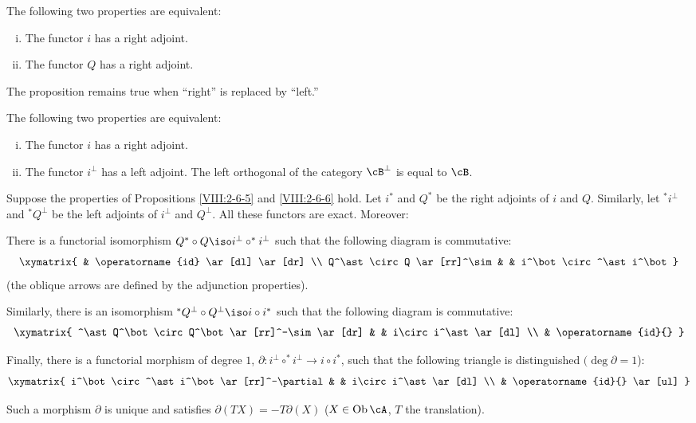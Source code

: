 \documentclass[oneside]{book}
\begin{document}
\begin{proposition}\label{VIII:2-6-5}
The following two properties are equivalent:
\begin{enumerate}[(i)]
  \item The functor $i$ has a right adjoint.
  \item The functor $Q$ has a right adjoint.
\end{enumerate}
\end{proposition}

The proposition remains true when “right” is replaced by “left.”

\begin{proposition}\label{VIII:2-6-6}
The following two properties are equivalent:
\begin{enumerate}[(i)]
  \item The functor $i$ has a right adjoint.
  \item The functor $i^\bot$ has a left adjoint. The left orthogonal of the
    category $\cB^\bot$ is equal to $\cB$.
\end{enumerate}
\end{proposition}

\begin{proposition}\label{VIII:2-6-7}
Suppose the properties of Propositions \ref{VIII:2-6-5} and
\ref{VIII:2-6-6} hold. Let $i^\ast$ and $Q^\ast$ be the right adjoints of
$i$ and $Q$. Similarly, let $^\ast i^\bot$ and $^\ast Q^\bot$ be the left
adjoints of $i^\bot$ and $Q^\bot$. All these functors are exact. Moreover:

There is a functorial isomorphism
$Q^\ast\circ Q\iso i^\bot\circ ^\ast i^\bot$ such that the following
diagram is commutative:
\[\xymatrix{
  & \operatorname{id} \ar[dl] \ar[dr] \\
  Q^\ast \circ Q \ar[rr]^\sim
    & & i^\bot\circ ^\ast i^\bot
}\]
(the oblique arrows are defined by the adjunction properties).

Similarly, there is an isomorphism
$^\ast Q^\bot \circ Q^\bot \iso i\circ i^\ast$ such that the following
diagram is commutative:
\[\xymatrix{
  ^\ast Q^\bot\circ Q^\bot \ar[rr]^-\sim \ar[dr]
    & & i\circ i^\ast \ar[dl] \\
  & \operatorname{id}{}
}\]

Finally, there is a functorial morphism of degree $1$,
$\partial:i^\bot\circ ^\ast i^\bot \to i\circ i^\ast$, such that the
following triangle is distinguished $(\deg\partial=1$):
\[\xymatrix{
  i^\bot \circ ^\ast i^\bot \ar[rr]^-\partial
    & & i\circ i^\ast \ar[dl] \\
  & \operatorname{id}{} \ar[ul]
}\]

Such a morphism $\partial$ is unique and satisfies
$\partial(TX)=-T\partial(X)$ ($X\in\operatorname{Ob}\cA$, $T$ the
translation).
\end{proposition}
\end{document}
